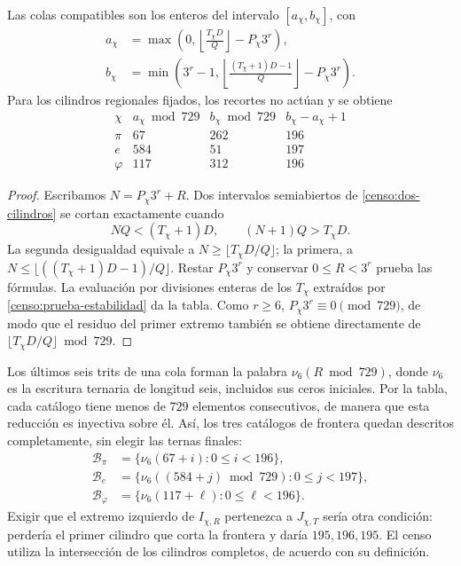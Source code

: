 \begin{proposition}
\label{censo:catalogos}
Las colas compatibles son los enteros del intervalo \([a_\chi,b_\chi]\),
con
\begin{align}
 a_\chi&=\max\left(0,
       \left\lfloor\frac{T_\chi D}{Q}\right\rfloor-P_\chi3^r\right),
       \label{censo:extremo-a}\\
 b_\chi&=\min\left(3^r-1,
       \left\lfloor\frac{(T_\chi+1)D-1}{Q}\right\rfloor-P_\chi3^r\right).
       \label{censo:extremo-b}
\end{align}
Para los cilindros regionales fijados, los recortes no actúan y se obtiene
\begin{equation}
\begin{array}{c|r|r|r}
 \chi&a_\chi\bmod729&b_\chi\bmod729&b_\chi-a_\chi+1\\\hline
 \pi&67&262&196\\
 e&584&51&197\\
 \varphi&117&312&196
\end{array}
\label{censo:tabla-catalogos}
\end{equation}
\end{proposition}
\begin{proof}
Escribamos \(N=P_\chi3^r+R\). Dos intervalos semiabiertos de
\eqref{censo:dos-cilindros} se cortan exactamente cuando
\[
 NQ<(T_\chi+1)D,\qquad (N+1)Q>T_\chi D.
\]
La segunda desigualdad equivale a
\(N\geq\lfloor T_\chi D/Q\rfloor\); la primera, a
\(N\leq\lfloor((T_\chi+1)D-1)/Q\rfloor\). Restar
\(P_\chi3^r\) y conservar \(0\leq R<3^r\) prueba las fórmulas.
La evaluación por divisiones enteras de los \(T_\chi\) extraídos por
\eqref{censo:prueba-estabilidad} da la tabla. Como \(r\geq6\),
\(P_\chi3^r\equiv0\pmod{729}\), de modo que el residuo del primer
extremo también se obtiene directamente de
\(\lfloor T_\chi D/Q\rfloor\bmod729\).
\end{proof}

Los últimos seis trits de una cola forman la palabra
\(\nu_6(R\bmod729)\), donde \(\nu_6\) es la escritura ternaria
de longitud seis, incluidos sus ceros iniciales. Por la tabla, cada
catálogo tiene menos de \(729\) elementos consecutivos, de manera que
esta reducción es inyectiva sobre él. Así, los tres catálogos de frontera
quedan descritos completamente, sin elegir las ternas finales:
\begin{equation}
 \begin{split}
 \mathcal B_\pi&=\{\nu_6(67+i):0\leq i<196\},\\
 \mathcal B_e&=\{\nu_6((584+j)\bmod729):0\leq j<197\},\\
 \mathcal B_\varphi&=\{\nu_6(117+\ell):0\leq\ell<196\}.
 \end{split}
 \label{censo:fronteras-explicitas}
\end{equation}
Exigir que el extremo izquierdo de \(I_{\chi,R}\) pertenezca a
\(J_{\chi,T}\) sería otra condición: perdería el primer cilindro
que corta la frontera y daría \(195,196,195\). El censo utiliza la
intersección de los cilindros completos, de acuerdo con su definición.

